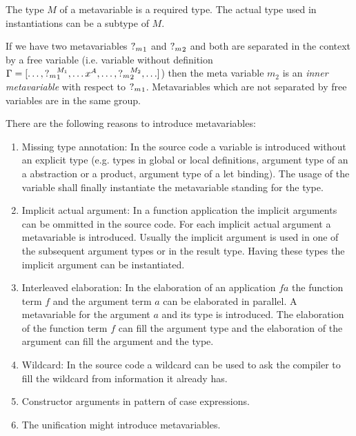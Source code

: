 The type $M$ of a metavariable is a required type. The actual type used in
instantiations can be a subtype of $M$.

If we have two metavariables ${?_{m}}_1$ and ${?_{m}}_2$ and both are separated
in the context by a free variable (i.e. variable without definition $\Gamma = [
    \ldots, {?_{m}}_1^{M_1}, \ldots x^A, \ldots, {?_{m}}_2^{M_2}, \ldots]$) then
the meta variable $m_2$ is an \emph{inner metavariable} with respect to ${?_{m}}_1$. Metavariables which are not separated by free variables are in the same
group.

There are the following reasons to introduce metavariables:
\begin{enumerate}
    \item Missing type annotation: In the source code a variable is introduced
        without an explicit type (e.g. types in global or local definitions,
        argument type of an a abstraction or a product, argument type of a let
        binding). The usage of the variable shall finally instantiate the
        metavariable standing for the type.

    \item Implicit actual argument: In a function application the implicit
        arguments can be ommitted in the source code. For each implicit actual
        argument a metavariable is introduced. Usually the implicit argument is
        used in one of the subsequent argument types or in the result type.
        Having these types the implicit argument can be instantiated.

    \item Interleaved elaboration: In the elaboration of an application $f a$
        the function term $f$ and the argument term $a$ can be elaborated in
        parallel. A metavariable for the argument $a$ and its type is
        introduced. The elaboration of the function term $f$ can fill the
        argument type and the elaboration of the argument can fill the argument
        and the type.

    \item Wildcard: In the source code a wildcard can be used to ask the
        compiler to fill the wildcard from information it already has.

    \item Constructor arguments in pattern of case expressions.

    \item The unification might introduce metavariables.
\end{enumerate}





